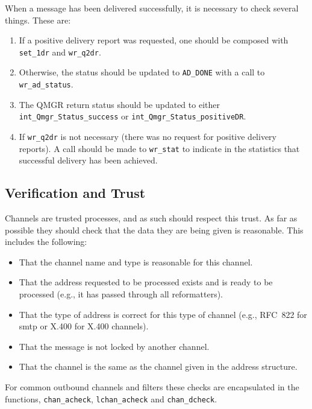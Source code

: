 When a message has been delivered successfully, it is necessary to
check several things. These are:
\begin{enumerate}
\item	If a positive delivery report was requested, one should be
composed with \verb|set_1dr| and \verb|wr_q2dr|.
\item	Otherwise, the status should be updated to \verb|AD_DONE|
with a call to 
\linebreak
\verb|wr_ad_status|.
\item	The QMGR return status should be updated to either
\linebreak
\verb|int_Qmgr_Status_success| or \verb|int_Qmgr_Status_positiveDR|.
\item	If \verb|wr_q2dr| is not necessary (there was no request for
positive delivery reports). A call should be made to \verb|wr_stat| to
indicate in the statistics that successful delivery has been achieved.
\end{enumerate}

\subsection {Verification and Trust}

Channels are trusted processes, and as such should respect this trust.
As far as possible they should check that the data they are being
given is reasonable. This includes the following:
\begin{itemize}
\item	That the channel name and type is reasonable for this channel.

\item	That the address requested to be processed exists and is ready
to be processed (e.g., it has passed through all reformatters).

\item	That the type of address is correct for this type of channel
(e.g., RFC~822 for smtp or X.400 for X.400 channels).

\item	That the message is not locked by another channel.

\item 	That the channel is the same as the channel given in the
address structure.
\end{itemize}

For common outbound channels and filters these checks are encapsulated
in the functions, \verb|chan_acheck|,
\verb|lchan_acheck| and
\verb|chan_dcheck|.

